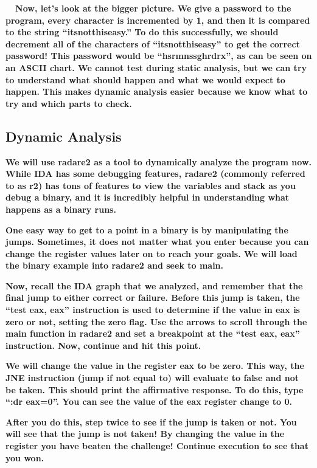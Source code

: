 \documentclass[letterpaper]{article}
\newcommand{\sitfig}[3]{
\begin{figure}[H]
\centering
\makebox[\textwidth][c]{
#2
}
\label{#1}
\end{figure}
}
\newcommand{\sitgfx}[4][scale=1.0]{
\sitfig{#3}{\texttt{[image: \#2]}}{#4}
}
\begin{document}
\textbf{ \ \ Now, let's look at the bigger picture. We give a password to the program, every character is incremented by
1, and then it is compared to the string ``itsnotthiseasy.'' To do this successfully, we should decrement all of the
characters of ``itsnotthiseasy'' to get the correct password! This password would be
``hsrmnssghrd{\textasciigrave}rx'', as can be seen on an ASCII chart. We cannot test during static analysis, but we can
try to understand what should happen and what we would expect to happen. This makes dynamic analysis easier because we
know what to try and which parts to check.}

\subsection{Dynamic Analysis}

\textbf{We will use radare2 as a tool to dynamically analyze the program now. While IDA has some debugging features,
radare2 (commonly referred to as r2) has tons of features to view the variables and stack as you debug a binary, and it
is incredibly helpful in understanding what happens as a binary runs.}

\textbf{One easy way to get to a point in a binary is by manipulating the jumps. Sometimes, it does not matter what you
enter because you can change the register values later on to reach your goals. We will load the binary example into
radare2 and seek to main.}

  
\sitgfx[width=6.5in,height=4.0626in]{reversing-img053.png}{fig:unk}{TODO CAPTION}
 \textbf{Now, recall the IDA graph that we analyzed, and remember that the final jump to either correct or failure.
Before this jump is taken, the ``test eax, eax'' instruction is used to determine if the value in eax is zero or not,
setting the zero flag. Use the arrows to scroll through the main function in radare2 and set a breakpoint at the ``test
eax, eax'' instruction. Now, continue and hit this point.}

  
\sitgfx[width=6.5in,height=4.0626in]{reversing-img054.png}{fig:unk}{TODO CAPTION}
 \textbf{We will change the value in the register eax to be zero. This way, the JNE instruction (jump if not equal to)
will evaluate to false and not be taken. This should print the affirmative response. To do this, type ``:dr eax=0''.
You can see the value of the eax register change to 0. }  
\sitgfx[width=6.5in,height=4.0626in]{reversing-img055.png}{fig:unk}{TODO CAPTION}
 

\textbf{After you do this, step twice to see if the jump is taken or not. You will see that the jump is not taken! By
changing the value in the register you have beaten the challenge! Continue execution to see that you won.}
\end{document}

